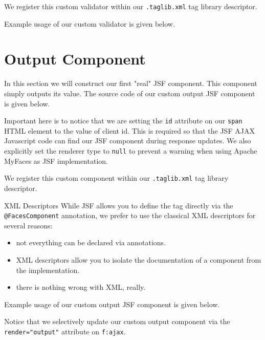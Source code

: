 We register this custom validator within our \texttt{.taglib.xml} tag library descriptor.


Example usage of our custom validator is given below.


\section{Output Component}
In this section we will construct our first "real" JSF component.
This component simply outputs its value.
The source code of our custom output JSF component is given below.

Important here is to notice that we are setting the \texttt{id} attribute on our \texttt{span} HTML element to the value of client id.
This is required so that the JSF AJAX Javascript code can find our JSF component during response updates.
We also explicitly set the renderer type to \texttt{null} to prevent a warning when using Apache MyFaces \cite{myfaces} as JSF implementation.

We register this custom component within our \texttt{.taglib.xml} tag library descriptor.


\begin{TIP}{XML Descriptors}
While JSF allows you to define the tag directly via the \texttt{@FacesComponent} annotation,
we prefer to use the classical XML descriptors for several reasons:
\begin{itemize}
	\item not everything can be declared via annotations.
	\item XML descriptors allow you to isolate the documentation of a component from the implementation.
	\item there is nothing wrong with XML, really.
\end{itemize}
\end{TIP}

Example usage of our custom output JSF component is given below.

Notice that we selectively update our custom output component via the \texttt{render="output"} attribute on \texttt{f:ajax}.

